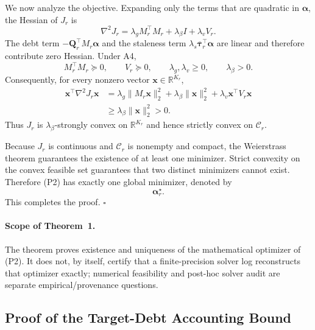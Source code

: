 \documentclass[letterpaper,journal]{IEEEtran}
\begin{document}
We now analyze the objective.  Expanding only the terms that are quadratic in
$\boldsymbol\alpha$, the Hessian of $J_r$ is
\begin{equation}
 \nabla^2J_r
 =
 \lambda_gM_r^{\top}M_r
 +
 \lambda_{\beta}I
 +
 \lambda_vV_r.
 \label{eq:app_P2_hessian}
\end{equation}
The debt term
$-\mathbf{Q}_r^{\top}M_r\boldsymbol\alpha$ and the staleness term
$\lambda_s\overline{\boldsymbol\tau}_r^{\top}\boldsymbol\alpha$ are linear and
therefore contribute zero Hessian.  Under A4,
\begin{equation}
    M_r^{\top}M_r\succeq0,
    \qquad
    V_r\succeq0,
    \qquad
    \lambda_g,\lambda_v\ge0,
    \qquad
    \lambda_{\beta}>0.
    \label{eq:app_psd_terms}
\end{equation}
Consequently, for every nonzero vector $\mathbf{x}\in\mathbb{R}^{K_r}$,
\begin{align}
 \mathbf{x}^{\top}\nabla^2J_r\mathbf{x}
 &=
 \lambda_g\|M_r\mathbf{x}\|_2^2
 +
 \lambda_{\beta}\|\mathbf{x}\|_2^2
 +
 \lambda_v\mathbf{x}^{\top}V_r\mathbf{x}
 \nonumber\\
 &\ge
 \lambda_{\beta}\|\mathbf{x}\|_2^2
 >0.
 \label{eq:app_strong_convex}
\end{align}
Thus $J_r$ is $\lambda_{\beta}$-strongly convex on
$\mathbb{R}^{K_r}$ and hence strictly convex on $\mathcal{C}_r$.

Because $J_r$ is continuous and $\mathcal{C}_r$ is nonempty and compact, the
Weierstrass theorem guarantees the existence of at least one minimizer.
Strict convexity on the convex feasible set guarantees that two distinct
minimizers cannot exist.  Therefore (P2) has exactly one global minimizer,
denoted by
\begin{equation}
    \boldsymbol\alpha_r^\star.
\end{equation}
This completes the proof. \hfill$\square$

\paragraph{Scope of Theorem~1.}
The theorem proves existence and uniqueness of the mathematical optimizer of
(P2).  It does not, by itself, certify that a finite-precision solver log
reconstructs that optimizer exactly; numerical feasibility and post-hoc solver
audit are separate empirical/provenance questions.


\subsection{Proof of the Target-Debt Accounting Bound}
\label{app:proof_debt_bound}
\end{document}
